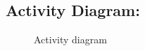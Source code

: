 \documentclass[oneside,a4paper,12pt]{report}
\begin{document}
\subsection{Activity Diagram:}

\begin{center}
	\begin{figure}[!htbp]
		\centering
	  \caption{Activity diagram}
	  \label{fig:act-dig}
	\end{figure}
\end{center}  

\newpage
\end{document}
